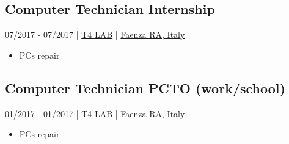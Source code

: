 \documentclass{article}
\begin{document}
\begin{paracol}{2}
\subsection*{ Computer Technician Internship}
 07/2017 - 07/2017 \hfill | \hfill
\href{https://www.t4lab.it/}{ T4 LAB} \hfill | \hfill
\href{https://www.openstreetmap.org/node/4751590216}{ Faenza RA, Italy}
\begin{itemize}
    \item {} PCs repair
\end{itemize}

\subsection*{ Computer Technician PCTO (work/school)}
 01/2017 - 01/2017 \hfill | \hfill
\href{https://www.t4lab.it/}{ T4 LAB} \hfill | \hfill
\href{https://www.openstreetmap.org/node/4751590216}{ Faenza RA, Italy}
\begin{itemize}
    \item {} PCs repair
\end{itemize}


\vfill

\end{paracol}
\end{document}
